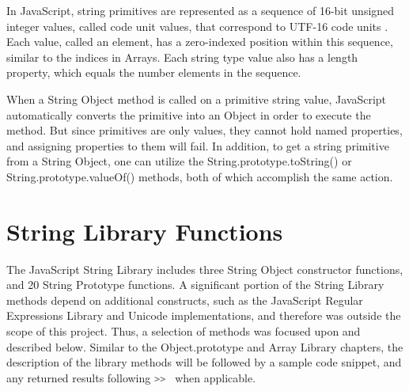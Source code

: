 \documentclass[a4paper,11pt,twoside]{report}
\def\jsinline{\lstinline[language=JavaScript, basicstyle=\small]}
\begin{document}
In JavaScript, string primitives are represented as a sequence of 16-bit unsigned integer values, called code unit values, that correspond to UTF-16 code units \cite{EcmaScript}. Each value, called an element, has a zero-indexed position within this sequence, similar to the indices in Arrays. Each string type value also has a length property, which equals the number elements in the sequence.

When a String Object method is called on a primitive string value, JavaScript automatically converts the primitive into an Object in order to execute the method. But since primitives are only values, they cannot hold named properties, and assigning properties to them will fail. In addition, to get a string primitive from a String Object, one can utilize the String.prototype.toString() or String.prototype.valueOf() methods, both of which accomplish the same action.

\section{String Library Functions}\label{sec:stringmethods}
The JavaScript String Library includes three String Object constructor functions, and 20 String Prototype functions. A significant portion of the String Library methods depend on additional constructs, such as the JavaScript Regular Expressions Library and Unicode implementations, and therefore was outside the scope of this project. Thus, a selection of methods was focused upon and described below. Similar to the Object.prototype and Array Library chapters, the description of the library methods will be followed by a sample code snippet, and any returned results following \jsinline|>> | when applicable.
\end{document}
